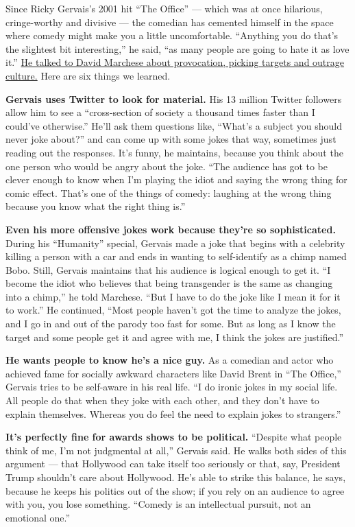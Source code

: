 Since Ricky Gervais's 2001 hit ``The Office'' --- which was at once
hilarious, cringe-worthy and divisive --- the comedian has cemented
himself in the space where comedy might make you a little uncomfortable.
``Anything you do that's the slightest bit interesting,'' he said, ``as
many people are going to hate it as love it.''
\href{https://www.nytimes3xbfgragh.onion/interactive/2019/03/19/magazine/ricky-gervais-after-life-comedy-twitter.html}{He
talked to David Marchese about provocation, picking targets and outrage
culture.} Here are six things we learned.

\textbf{Gervais uses Twitter to look for material.} His 13 million
Twitter followers allow him to see a ``cross-section of society a
thousand times faster than I could've otherwise.'' He'll ask them
questions like, ``What's a subject you should never joke about?'' and
can come up with some jokes that way, sometimes just reading out the
responses. It's funny, he maintains, because you think about the one
person who would be angry about the joke. ``The audience has got to be
clever enough to know when I'm playing the idiot and saying the wrong
thing for comic effect. That's one of the things of comedy: laughing at
the wrong thing because you know what the right thing is.''

\textbf{Even his more offensive jokes work because they're so
sophisticated.} During his ``Humanity'' special, Gervais made a joke
that begins with a celebrity killing a person with a car and ends in
wanting to self-identify as a chimp named Bobo. Still, Gervais maintains
that his audience is logical enough to get it. ``I become the idiot who
believes that being transgender is the same as changing into a chimp,''
he told Marchese. ``But I have to do the joke like I mean it for it to
work.'' He continued, ``Most people haven't got the time to analyze the
jokes, and I go in and out of the parody too fast for some. But as long
as I know the target and some people get it and agree with me, I think
the jokes are justified.''

\textbf{He wants people to know he's a nice guy.} As a comedian and
actor who achieved fame for socially awkward characters like David Brent
in ``The Office,'' Gervais tries to be self-aware in his real life. ``I
do ironic jokes in my social life. All people do that when they joke
with each other, and they don't have to explain themselves. Whereas you
do feel the need to explain jokes to strangers.''

\textbf{It's perfectly fine for awards shows to be political.} ``Despite
what people think of me, I'm not judgmental at all,'' Gervais said. He
walks both sides of this argument --- that Hollywood can take itself too
seriously or that, say, President Trump shouldn't care about Hollywood.
He's able to strike this balance, he says, because he keeps his politics
out of the show; if you rely on an audience to agree with you, you lose
something. ``Comedy is an intellectual pursuit, not an emotional one.''


